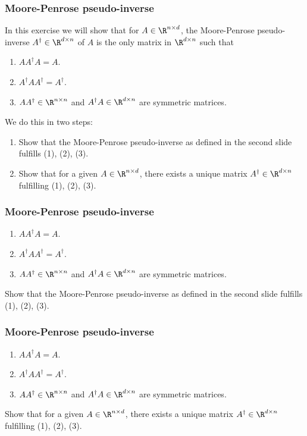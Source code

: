 \documentclass{beamer}
\begin{document}
\begin{frame}[t] 
\frametitle{Moore-Penrose pseudo-inverse}
\vspace{-5pt}
In this exercise we will show that for $A \in \R^{n \times d}$, the Moore-Penrose pseudo-inverse $A^{\dagger} \in \R^{d \times n}$ of $A$ is the only matrix in $\R^{d \times n}$ such that
\begin{enumerate}
\item $A A^{\dagger} A = A$.
\item $A^{\dagger} A A^{\dagger} = A^{\dagger}$.
\item $A A^{\dagger} \in \R^{n \times n}$ and $A^{\dagger} A \in \R^{d \times n}$ are symmetric matrices.
\end{enumerate}
We do this in two steps:
\begin{enumerate}
\item Show that the Moore-Penrose pseudo-inverse as defined in the second slide fulfills (1), (2), (3).
\item Show that for a given $A \in \R^{n \times d}$, there exists a unique matrix $A^{\dagger} \in \R^{d \times n}$ fulfilling (1), (2), (3).
\end{enumerate}
\pause
\end{frame}

\begin{frame}[t] 
\frametitle{Moore-Penrose pseudo-inverse}
\vspace{-5pt}
\begin{enumerate}
\item $A A^{\dagger} A = A$.
\item $A^{\dagger} A A^{\dagger} = A^{\dagger}$.
\item $A A^{\dagger} \in \R^{n \times n}$ and $A^{\dagger} A \in \R^{d \times n}$ are symmetric matrices.
\end{enumerate}
Show that the Moore-Penrose pseudo-inverse as defined in the second slide fulfills (1), (2), (3).
\pause
\pause
\end{frame}

\begin{frame}[t] 
\frametitle{Moore-Penrose pseudo-inverse}
\vspace{-5pt}
\begin{enumerate}
\item $A A^{\dagger} A = A$.
\item $A^{\dagger} A A^{\dagger} = A^{\dagger}$.
\item $A A^{\dagger} \in \R^{n \times n}$ and $A^{\dagger} A \in \R^{d \times n}$ are symmetric matrices.
\end{enumerate}
Show that for a given $A \in \R^{n \times d}$, there exists a unique matrix $A^{\dagger} \in \R^{d \times n}$ fulfilling (1), (2), (3).
\pause
\pause
\end{frame}
\end{document}
